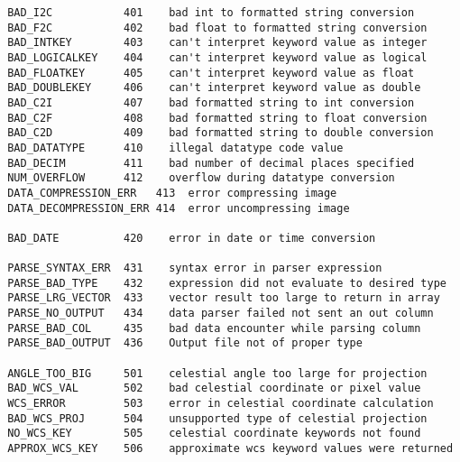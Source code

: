 \documentclass[11pt]{article}
\begin{document}
\begin{verbatim}
 BAD_I2C           401    bad int to formatted string conversion
 BAD_F2C           402    bad float to formatted string conversion
 BAD_INTKEY        403    can't interpret keyword value as integer
 BAD_LOGICALKEY    404    can't interpret keyword value as logical
 BAD_FLOATKEY      405    can't interpret keyword value as float
 BAD_DOUBLEKEY     406    can't interpret keyword value as double
 BAD_C2I           407    bad formatted string to int conversion
 BAD_C2F           408    bad formatted string to float conversion
 BAD_C2D           409    bad formatted string to double conversion
 BAD_DATATYPE      410    illegal datatype code value
 BAD_DECIM         411    bad number of decimal places specified
 NUM_OVERFLOW      412    overflow during datatype conversion
 DATA_COMPRESSION_ERR   413  error compressing image 
 DATA_DECOMPRESSION_ERR 414  error uncompressing image 

 BAD_DATE          420    error in date or time conversion 

 PARSE_SYNTAX_ERR  431    syntax error in parser expression 
 PARSE_BAD_TYPE    432    expression did not evaluate to desired type 
 PARSE_LRG_VECTOR  433    vector result too large to return in array 
 PARSE_NO_OUTPUT   434    data parser failed not sent an out column 
 PARSE_BAD_COL     435    bad data encounter while parsing column 
 PARSE_BAD_OUTPUT  436    Output file not of proper type          

 ANGLE_TOO_BIG     501    celestial angle too large for projection 
 BAD_WCS_VAL       502    bad celestial coordinate or pixel value 
 WCS_ERROR         503    error in celestial coordinate calculation  
 BAD_WCS_PROJ      504    unsupported type of celestial projection 
 NO_WCS_KEY        505    celestial coordinate keywords not found
 APPROX_WCS_KEY    506    approximate wcs keyword values were returned
\end{verbatim}
\end{document}
